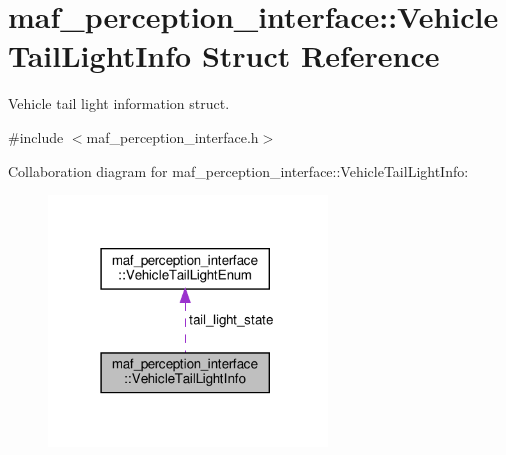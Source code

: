 \hypertarget{structmaf__perception__interface_1_1VehicleTailLightInfo}{}\section{maf\+\_\+perception\+\_\+interface\+:\+:Vehicle\+Tail\+Light\+Info Struct Reference}
\label{structmaf__perception__interface_1_1VehicleTailLightInfo}


Vehicle tail light information struct.  




{\ttfamily \#include $<$maf\+\_\+perception\+\_\+interface.\+h$>$}



Collaboration diagram for maf\+\_\+perception\+\_\+interface\+:\+:Vehicle\+Tail\+Light\+Info\+:\nopagebreak
\begin{figure}[H]
\begin{center}
\leavevmode
\includegraphics[width=210pt]{structmaf__perception__interface_1_1VehicleTailLightInfo__coll__graph}
\end{center}
\end{figure}
